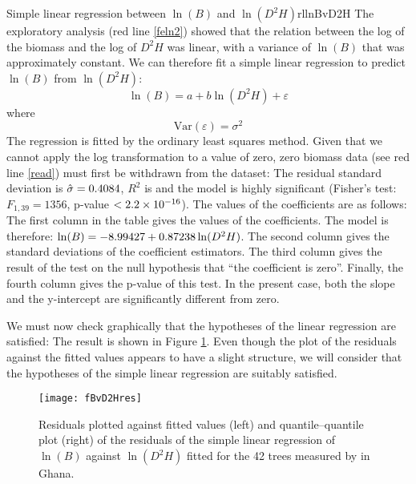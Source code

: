 \begin{filrouge}{
Simple linear regression between $\ln(B)$ and $\ln(D^2H)$}{rllnBvD2H}%
The exploratory analysis (red line \ref{feln2}) showed that the relation between the log of the biomass and the log of $D^2H$ was linear, with a variance of $\ln(B)$ that was approximately constant. We can therefore fit a simple linear regression to predict $\ln(B)$ from $\ln(D^2H)$:
\[
\ln(B)=a+b\ln(D^2H)+\varepsilon
\]
where
\[
\mathrm{Var}(\varepsilon)=\sigma^2
\]
The regression is fitted by the ordinary least squares method. Given that we cannot apply the log transformation to a value of zero, zero biomass data (see red line \ref{read}) must first be withdrawn from the dataset:
%
The residual standard deviation is $\hat{\sigma}=\mbox{0.4084}$, $R^2$ is  and the model is highly significant (Fisher's test: $F_{1,39}=1356$, p-value $<\mbox{2.2}\times10^{-16}$). The values of the coefficients are as follows:
%
The first column in the table gives the values of the coefficients. The model is therefore:
$\ln(B)=-\mbox{8.99427}+\mbox{0.87238}\ln(D^2H)$. The second column gives the standard deviations of the coefficient estimators. The third column gives the result of the test on the null hypothesis that ``the coefficient is zero''. Finally, the fourth column gives the p-value of this test. In the present case, both the slope and the y-intercept are significantly different from zero.

We must now check graphically that the hypotheses of the linear regression are satisfied:
%
The result is shown in  Figure \ref{fBvD2Hres}. Even though the plot of the residuals against the fitted values appears to have a slight structure, we will consider that the hypotheses of the simple linear regression are suitably satisfied.
\end{filrouge}

\begin{figure}[htb]
\texttt{[image: fBvD2Hres]}
\caption[Residuals plotted against fitted values and quantile--quantile plot of the residuals of the simple linear regression of $\ln(B)$ against $\ln(D^2H)$ fitted for the 42 trees measured by \citet{henry10} in Ghana]{Residuals plotted against fitted values (left) and quantile--quantile plot (right) of the residuals of the simple linear regression of $\ln(B)$ against $\ln(D^2H)$ fitted for the 42 trees measured by \citet{henry10} in Ghana.\label{fBvD2Hres}}
\end{figure}

